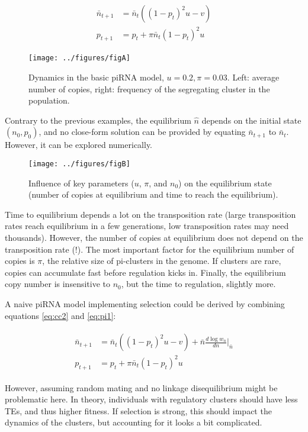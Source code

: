 \documentclass[10pt,a4paper]{article}
\begin{document}
\begin{align}\label{eq:pi1}
\begin{split}
\bar n_{t+1} &= \bar n_t( (1-p_t)^2 u - v) \\
p_{t+1} &= p_t + \pi \bar n_t (1-p_t)^2 u
\end{split}
\end{align}

\begin{figure}[h]
\begin{center}
	\texttt{[image: ../figures/figA]}
\caption{Dynamics in the basic piRNA model, $u=0.2, \pi=0.03$. Left: average number of copies, right: frequency of the segregating cluster in the population. }
\end{center}
\end{figure}


Contrary to the previous examples, the equilibrium $\hat n$  depends on the initial state $(n_0, p_0)$, and no close-form solution can be provided by equating $\bar n_{t+1}$ to $\bar n_t$. However, it can be explored numerically.


\begin{figure}[t]
\begin{center}
\texttt{[image: ../figures/figB]}
\caption{Influence of key parameters ($u$, $\pi$, and $n_0$) on the equilibrium state (number of copies at equilibrium and time to reach the equilibrium). }
\end{center}
\end{figure}

Time to equilibrium depends a lot on the transposition rate (large transposition rates reach equilibrium in a few generations, low transposition rates may need thousands). However, the number of copies at equilibrium does not depend on the transposition rate (!). The most important factor for the equilibrium number of copies is $\pi$, the relative size of pi-clusters in the genome. If clusters are rare, copies can accumulate fast before regulation kicks in. Finally, the equilibrium copy number is insensitive to $n_0$, but the time to regulation, slightly more. 

A naive piRNA model implementing selection could be derived by combining equations \ref{eq:cc2} and \ref{eq:pi1}:

\begin{align}\label{eq:pi2}
\begin{split}
\bar n_{t+1} &= \bar n_t((1-p_t)^2 u - v) + \bar n \frac{d \log w_n}{d n} \Bigr|_{\bar n}\\
p_{t+1} &= p_t + \pi \bar n_t (1-p_t)^2 u
\end{split}
\end{align}

However, assuming random mating and no linkage disequilibrium might be problematic here. In theory, individuals with regulatory clusters should have less TEs, and thus higher fitness. If selection is strong, this should impact the dynamics of the clusters, but accounting for it looks a bit complicated. 


\printbibliography
\end{document}

